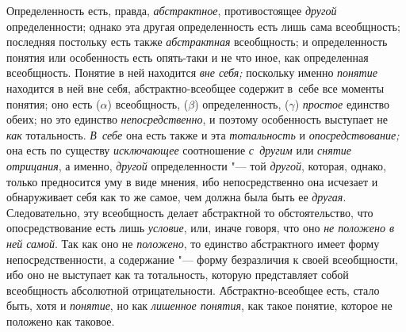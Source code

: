 Определенность есть, правда, {\em абстрактное}, противостоящее {\em другой}
определенности; однако эта другая определенность есть лишь
сама всеобщность; последняя постольку есть также {\em абстрактная}
всеобщность; и определенность понятия или особенность есть
опять-таки и не что иное, как определенная всеобщность. Понятие в ней
находится {\em вне себя;} поскольку именно {\em понятие} находится в
ней вне себя, абстрактно-всеобщее содержит в~себе все моменты понятия; оно
есть ($\alpha $) всеобщность, ($\beta $) определенность, ($\gamma $)
{\em простое} единство обеих; но это единство {\em непосредственно}, и
поэтому особенность выступает не {\em как} тотальность. {\em В~себе} она есть
также и эта {\em тотальность} и {\em опосредствование;}
она есть по существу {\em исключающее} соотношение {\em с~другим} или
{\em снятие отрицания}, а именно, {\em другой} определенности "--- той
{\em другой}, которая, однако, только предносится уму в виде мнения, ибо
непосредственно она исчезает и обнаруживает себя как то же самое, чем должна
была быть ее {\em другая}. Следовательно, эту всеобщность делает абстрактной
то обстоятельство, что опосредствование есть лишь {\em условие}, или, иначе
говоря, что оно {\em не положено в ней самой}. Так как оно не {\em положено},
то единство абстрактного имеет форму непосредственности, а содержание
"--- форму безразличия к своей всеобщности, ибо оно не выступает
как та тотальность, которую представляет собой всеобщность абсолютной
отрицательности. Абстрактно-всеобщее есть, стало быть, хотя и
{\em понятие}, но как {\em лишенное понятия},
как такое понятие, которое не положено как таковое.

